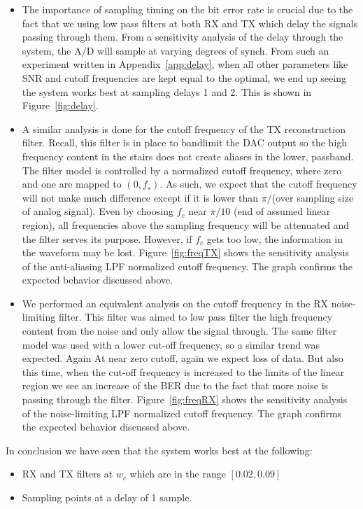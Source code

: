 \documentclass[]{article}
\begin{document}
\begin{itemize}
\item The importance of sampling timing on the bit error rate is crucial due to the fact that we using low pass filters at both RX and TX  which delay the signals passing through them. From a sensitivity analysis of the delay through the system, the A/D will sample at varying degrees of synch. From such an experiment written in Appendix~\ref{app:delay}, when all other parameters like SNR and cutoff frequencies are kept equal to the optimal, we end up seeing the system works best at sampling delays 1 and 2. This is shown in Figure~\ref{fig:delay}.
\item A similar analysis is done for the cutoff frequency of the TX reconstruction filter. Recall, this filter is in place to bandlimit the DAC output so the high frequency content in the stairs does not create aliases in the lower, passband. The filter model is controlled by a normalized cutoff frequency, where zero and one are mapped to $\left(0,f_s\right)$.  As such, we expect that the cutoff frequency will not make much difference except if it is lower than $\pi/$(over sampling size of analog signal).  Even by choosing $f_c$ near $\pi/10$ (end of assumed linear region), all frequencies above the sampling frequency will be attenuated and the filter serves its purpose.  However, if $f_c$ gets too low, the information in the waveform may be lost. 
Figure~\ref{fig:freqTX} shows the sensitivity analysis of the anti-aliasing LPF normalized cutoff frequency.  The graph confirms the expected behavior discussed above.
\item We performed an equivalent analysis on the cutoff frequency in the RX noise-limiting filter.  This filter was aimed to low pass filter the high frequency content from the noise and only allow the signal through.  The same filter model was used with a lower cut-off frequency, so a similar trend was expected. Again At near zero cutoff, again we expect loss of data. But also this time, when the cut-off frequency is increased to the limits of the linear region we see an increase of the BER due to the fact that more noise is passing through the filter. Figure~\ref{fig:freqRX} shows the sensitivity analysis of the noise-limiting LPF normalized cutoff frequency.  The graph confirms the expected behavior discussed above.
\end{itemize}

In conclusion we have seen that the system works best at the following:
\begin{itemize}
\item RX and TX filters  at $w_c$ which are in the range $\left[0.02,0.09\right]  $
\item Sampling points at a delay of 1 sample.
\end{itemize}
\end{document}
